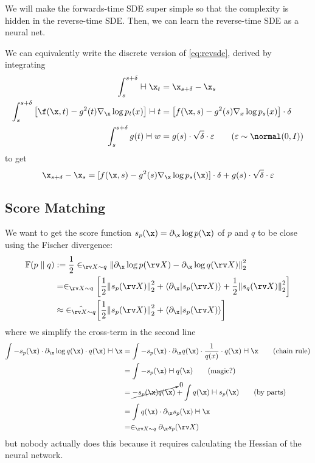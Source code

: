 \documentclass[class=cs480,notes,tikz]{agony}
\begin{document}
We will make the forwards-time SDE super simple so that the complexity is hidden
in the reverse-time SDE. Then, we can learn the reverse-time SDE as a neural net.

We can equivalently write the discrete version of \cref{eq:revsde}, derived by integrating
\begin{align*}
  \int_s^{s+\delta} \dd{\x_t}                                            & = \x_{s+\delta} - \x_s                                                         \\
  \int_s^{s+\delta}\qty[\f(\x,t) - g^2(t)\nabla_{\x} \log p_t(x)] \dd{t} & = \qty[f(\x,s) - g^2(s)\nabla_x\log p_s(x)]\cdot\delta                         \\
  \int_s^{s+\delta} g(t) \dd{w}                                          & = g(s)\cdot\sqrt{\delta}\cdot\varepsilon \tag{$\varepsilon \sim \normal(0,I)$}
\end{align*}
to get
\[
  \x_{s+\delta} - \x_s = [f(\x,s) - g^2(s)\nabla_{\x}\log p_s(\x)]\cdot\delta + g(s)\cdot\sqrt{\delta}\cdot\varepsilon
\]

\subsection*{Score Matching}

We want to get the score function $s_p(\x) = \partial_{\x}\log p(\x)$
of $p$ and $q$ to be close using the Fischer divergence:
\begin{align*}
  \F(p \parallel q)
   & := \frac12\E_{\rv X \sim q} \norm{\partial_{\x}\log p(\rv X) - \partial_{\x}\log q(\rv X)}^2_2                         \\
   & = \E_{\rv X \sim q} \qty[\frac12\norm{s_p(\rv X)}_2^2 + \ip{\partial_{\x}}{s_p(\rv X)} + \frac12\norm{s_q(\rv X)}_2^2] \\
   & \approx \hat{\E_{\rv X \sim q}} \qty[\frac12\norm{s_p(\rv X)}_2^2 + \ip{\partial_{\x}}{s_p(\rv X)}]
\end{align*}
where we simplify the cross-term in the second line
\begin{align*}
  \int -s_p(\x) \cdot \partial_{\x} \log q(\x) \cdot q(\x) \dd{\x}
   & = \int -s_p(\x) \cdot \partial_{\x} q(\x) \cdot \frac{1}{q(x)} \cdot q(\x) \dd{\x} \tag{chain rule} \\
   & = \int -s_p(\x) \dd{q(\x)} \tag{magic?}                                                             \\
   & = \cancelto{0}{-s_p(\x) q(\x)} + \int q(\x) \dd{s_p(\x)} \tag{by parts}                             \\
   & =  \int q(\x) \cdot \partial_{\x}s_p(\x) \dd{\x}                                                    \\
   & = \E_{\rv X \sim q} \partial_{\x} s_p(\rv X)
\end{align*}
but nobody actually does this because it requires calculating the Hessian of the neural network.
\end{document}
